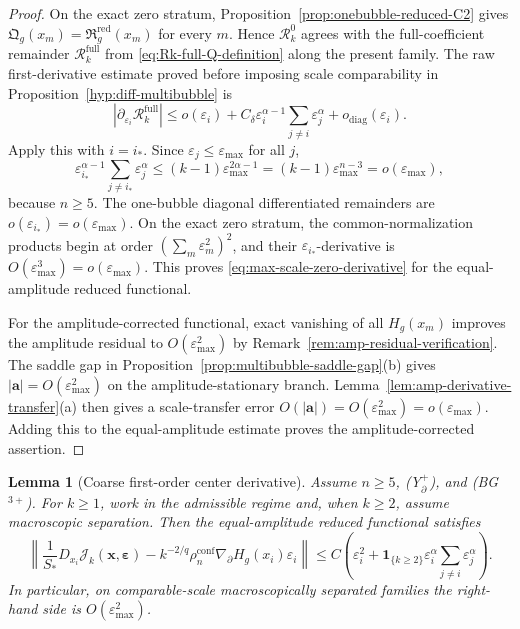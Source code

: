 \documentclass[11pt,reqno,a4paper]{amsart}
\numberwithin{equation}{section}
\theoremstyle{plain}
\newtheorem{lemma}[theorem]{Lemma}
\theoremstyle{remark}
\theoremstyle{plain}
\begin{document}
\begin{proof}
On the exact zero stratum, Proposition~\ref{prop:onebubble-reduced-C2} gives
$\mathfrak Q_g(x_m)=\mathfrak R_g^{\mathrm{red}}(x_m)$ for every $m$.  Hence
$\mathcal R_k^0$ agrees with the full-coefficient remainder
$\mathcal R_k^{\mathrm{full}}$ from \eqref{eq:Rk-full-Q-definition} along the present family.
The raw first-derivative estimate proved before imposing scale comparability in
Proposition~\ref{hyp:diff-multibubble} is
\begin{equation}\label{eq:max-scale-uses-raw-first}
|\partial_{\varepsilon_i}\mathcal R_k^{\mathrm{full}}|
\le o(\varepsilon_i)
+C_\delta\varepsilon_i^{\alpha-1}\sum_{j\ne i}\varepsilon_j^\alpha
+o_{\mathrm{diag}}(\varepsilon_i).
\end{equation}
Apply this with $i=i_\ast$.  Since $\varepsilon_j\le\varepsilon_{\max}$ for all $j$,
\[
\varepsilon_{i_\ast}^{\alpha-1}\sum_{j\ne i_\ast}\varepsilon_j^\alpha
\le (k-1)\varepsilon_{\max}^{2\alpha-1}
=(k-1)\varepsilon_{\max}^{n-3}
=o(\varepsilon_{\max}),
\]
because $n\ge5$.  The one-bubble diagonal differentiated remainders are
$o(\varepsilon_{i_\ast})=o(\varepsilon_{\max})$.  On the exact zero stratum, the common-normalization
products begin at order $(\sum_m\varepsilon_m^2)^2$, and their
$\varepsilon_{i_\ast}$-derivative is
$O(\varepsilon_{\max}^3)=o(\varepsilon_{\max})$.  This proves
\eqref{eq:max-scale-zero-derivative} for the equal-amplitude reduced functional.

For the amplitude-corrected functional, exact vanishing of all $H_g(x_m)$ improves the amplitude residual to
$O(\varepsilon_{\max}^2)$ by Remark~\ref{rem:amp-residual-verification}.  The saddle gap in
Proposition~\ref{prop:multibubble-saddle-gap}\textup{(b)} gives
$|\mathbf a|=O(\varepsilon_{\max}^2)$ on the amplitude-stationary branch.  Lemma~\ref{lem:amp-derivative-transfer}\textup{(a)}
then gives a scale-transfer error $O(|\mathbf a|)=O(\varepsilon_{\max}^2)=o(\varepsilon_{\max})$.
Adding this to the equal-amplitude estimate proves the amplitude-corrected assertion.
\end{proof}


\begin{lemma}[Coarse first-order center derivative]
\label{lem:coarse-center-first}
Assume $n\ge5$, \textup{(Y$^+_{\partial}$)}, and \textup{(BG$^{3+}$)}.  For $k\ge1$, work in the
admissible regime and, when $k\ge2$, assume macroscopic separation.  Then the equal-amplitude reduced
functional satisfies
\begin{equation}\label{eq:coarse-center-first}
\left\|
\frac1{S_\ast}D_{x_i}\mathcal J_k(\mathbf x,\boldsymbol\varepsilon)
-k^{-2/q}\rho_n^{\mathrm{conf}}\nabla_\partial H_g(x_i)\varepsilon_i
\right\|
\le C\left(\varepsilon_i^2+\mathbf 1_{\{k\ge2\}}\varepsilon_i^\alpha\sum_{j\ne i}\varepsilon_j^\alpha\right).
\end{equation}
In particular, on comparable-scale macroscopically separated families the right-hand side is
$O(\varepsilon_{\max}^2)$.
\end{lemma}
\end{document}
